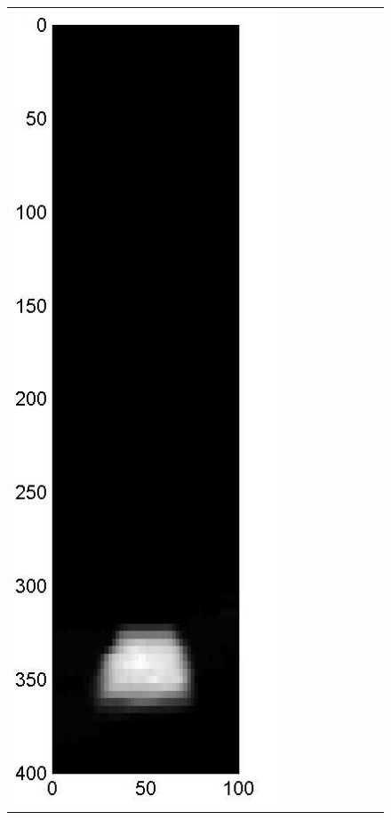 \documentclass[11pt]{article}
\begin{document}
{\begin{figure}[!h]
\begin{center}
\begin{tabular}{|c|c|c|c|c|c|c|c|c|}
			\includegraphics[width=.9\iwidth]{figures/newFigs/noisy/resultsExp-8-mkTV}
			&

\end{tabular}
\end{center}
\end{figure}}
\end{document}
